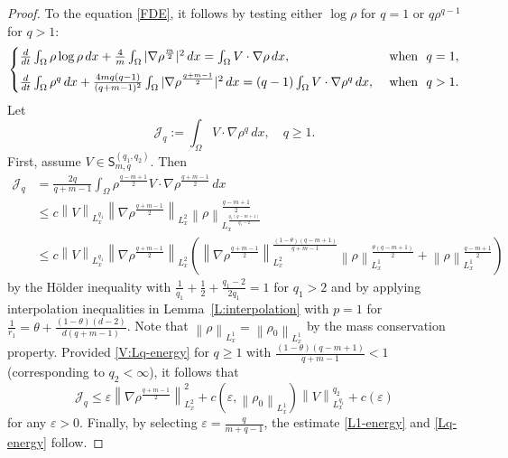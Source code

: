 \documentclass{amsart}
\numberwithin{equation}{section}
\begin{document}
\begin{proof}
To the equation \eqref{FDE}, it follows by testing either $\log \rho$ for $q=1$ or $q\rho^{q-1}$ for $q>1$: 
	\[
		\begin{cases}
			\frac{d}{dt}\int_{\Omega} \rho \log \rho \,dx + \frac{4}{m}\int_{\Omega} |\nabla \rho^{\frac{m}{2}}|^2 \,dx = \int_{\Omega} V \cdot \nabla \rho \,dx, &\text{ when } \ q=1, \vspace{2 mm}\\
			\frac{d}{dt}\int_{\Omega} \rho^q \,dx + \frac{4mq(q-1)}{(q+m-1)^2}\int_{\Omega} |\nabla \rho^{\frac{q+m-1}{2}}|^2 \,dx = (q-1)\int_{\Omega} V \cdot \nabla \rho^q \,dx, &\text{ when } \ q>1.
		\end{cases}
	\]
	Let 
	\[
	\mathcal{J}_{q} := \int_{\Omega} V \cdot \nabla \rho^q \,dx, \quad q\geq 1.
	\] 
   	First, assume $V \in \mathsf{S}_{m,q}^{(q_1,q_2)}$. Then 
   	\begin{equation}\label{Energy:V01}
	\begin{aligned} 
	\mathcal{J}_{q} &= \frac{2q}{q+m-1} \int_{\Omega} \rho^{\frac{q-m+1}{2}} V \cdot \nabla \rho^{\frac{q+m-1}{2}} \,dx \\
	&\leq c \left\|V\right\|_{L_{x}^{q_1}} \left\|\nabla \rho^{\frac{q+m-1}{2}}\right\|_{L_x^2} \left\|\rho\right\|_{L_{x}^{\frac{q_1 (q-m+1)}{q_1 - 2}}}^{\frac{q-m+1}{2}} \\
	&\leq c \left\|V\right\|_{L_{x}^{q_1}} \left\|\nabla \rho^{\frac{q+m-1}{2}}\right\|_{L_x^2}  \left(\left\|\nabla \rho^{\frac{q+m-1}{2}}\right\|_{L_x^2}^{\frac{(1-\theta)(q-m+1)}{q+m-1}} \left\|\rho\right\|_{L_{x}^{1}}^{\frac{\theta(q-m+1)}{2}} + \left\|\rho \right\|_{L_{x}^{1}}^{\frac{q-m+1}{2}} \right)
	\end{aligned}
	\end{equation}
	by the H\"{o}lder inequality with $\frac{1}{q_1} + \frac{1}{2}+ \frac{q_1 - 2}{2q_1}=1$ for $q_1 >2$ and by applying interpolation inequalities in Lemma~\ref{L:interpolation} with $p=1$ for $\frac{1}{r_1}= \theta + \frac{(1-\theta)(d-2)}{d(q+m-1)}$. 
	Note that $\left\|\rho \right\|_{L_{x}^1} = \left\|\rho_0 \right\|_{L_{x}^1}$ by the mass conservation property. Provided \eqref{V:Lq-energy} for $q\geq 1$ with $\frac{(1-\theta)(q-m+1)}{q+m-1} < 1$ (corresponding to $q_2 < \infty$), it follows that  
	\begin{equation*}\label{Energy:V02}
	\mathcal{J}_{q} \leq \varepsilon \left\|\nabla \rho^{\frac{q+m-1}{2}}\right\|_{L_x^2}^{2} + c(\varepsilon, \left\|\rho_0 \right\|_{L_{x}^1}) \left\|V\right\|_{L_{x}^{q_1}}^{q_2} + c(\varepsilon)
	\end{equation*}
	for any $\varepsilon>0$. Finally, by selecting $\varepsilon = \frac{q}{m+q-1}$, the estimate \eqref{L1-energy} and \eqref{Lq-energy} follow.
   		

\end{proof}
\end{document}
